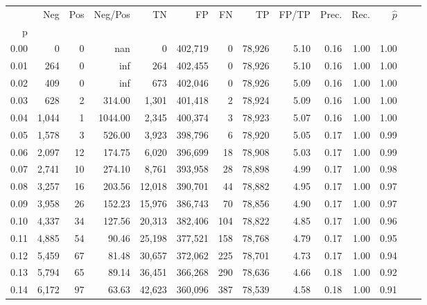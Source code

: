 \begin{tabular}{rrrrrrrrrrrrrr}
\toprule
{} &    Neg &    Pos &  Neg/Pos &       TN &       FP &      FN &      TP & FP/TP & Prec. &  Rec. & $\hat{p}$ \\
p    &        &        &          &          &          &         &         &       &       &       &           \\
\midrule
0.00 &      0 &      0 &      nan &        0 &  402,719 &       0 &  78,926 &  5.10 &  0.16 &  1.00 &      1.00 \\
0.01 &    264 &      0 &      inf &      264 &  402,455 &       0 &  78,926 &  5.10 &  0.16 &  1.00 &      1.00 \\
0.02 &    409 &      0 &      inf &      673 &  402,046 &       0 &  78,926 &  5.09 &  0.16 &  1.00 &      1.00 \\
0.03 &    628 &      2 &   314.00 &    1,301 &  401,418 &       2 &  78,924 &  5.09 &  0.16 &  1.00 &      1.00 \\
0.04 &  1,044 &      1 &  1044.00 &    2,345 &  400,374 &       3 &  78,923 &  5.07 &  0.16 &  1.00 &      1.00 \\
0.05 &  1,578 &      3 &   526.00 &    3,923 &  398,796 &       6 &  78,920 &  5.05 &  0.17 &  1.00 &      0.99 \\
0.06 &  2,097 &     12 &   174.75 &    6,020 &  396,699 &      18 &  78,908 &  5.03 &  0.17 &  1.00 &      0.99 \\
0.07 &  2,741 &     10 &   274.10 &    8,761 &  393,958 &      28 &  78,898 &  4.99 &  0.17 &  1.00 &      0.98 \\
0.08 &  3,257 &     16 &   203.56 &   12,018 &  390,701 &      44 &  78,882 &  4.95 &  0.17 &  1.00 &      0.97 \\
0.09 &  3,958 &     26 &   152.23 &   15,976 &  386,743 &      70 &  78,856 &  4.90 &  0.17 &  1.00 &      0.97 \\
0.10 &  4,337 &     34 &   127.56 &   20,313 &  382,406 &     104 &  78,822 &  4.85 &  0.17 &  1.00 &      0.96 \\
0.11 &  4,885 &     54 &    90.46 &   25,198 &  377,521 &     158 &  78,768 &  4.79 &  0.17 &  1.00 &      0.95 \\
0.12 &  5,459 &     67 &    81.48 &   30,657 &  372,062 &     225 &  78,701 &  4.73 &  0.17 &  1.00 &      0.94 \\
0.13 &  5,794 &     65 &    89.14 &   36,451 &  366,268 &     290 &  78,636 &  4.66 &  0.18 &  1.00 &      0.92 \\
0.14 &  6,172 &     97 &    63.63 &   42,623 &  360,096 &     387 &  78,539 &  4.58 &  0.18 &  1.00 &      0.91 \\

\end{tabular}

